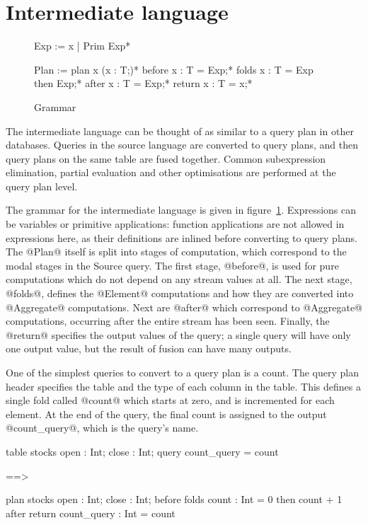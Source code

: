 \section{Intermediate language}
\label{s:IcicleCore}

\begin{figure}

\begin{code}
Exp   := x | Prim Exp*

Plan  := plan   x { (x : T;)* }
       before { x : T = Exp;* }
       folds  { x : T = Exp then Exp;* }
       after  { x : T = Exp;* }
       return { x : T = x;* }
\end{code}


\caption{Grammar}
\label{fig:core:grammar}
\end{figure}

The intermediate language can be thought of as similar to a query plan in other databases.
Queries in the source language are converted to query plans, and then query plans on the same table are fused together.
Common subexpression elimination, partial evaluation and other optimisations are performed at the query plan level.

The grammar for the intermediate language is given in figure~\ref{fig:core:grammar}.
Expressions can be variables or primitive applications: function applications are not allowed in expressions here, as their definitions are inlined before converting to query plans.
The @Plan@ itself is split into stages of computation, which correspond to the modal stages in the Source query.
The first stage, @before@, is used for pure computations which do not depend on any stream values at all.
The next stage, @folds@, defines the @Element@ computations and how they are converted into @Aggregate@ computations.
Next are @after@ which correspond to @Aggregate@ computations, occurring after the entire stream has been seen.
Finally, the @return@ specifies the output values of the query; a single query will have only one output value, but the result of fusion can have many outputs.

One of the simplest queries to convert to a query plan is a count.
The query plan header specifies the table and the type of each column in the table.
This defines a single fold called @count@ which starts at zero, and is incremented for each element.
At the end of the query, the final count is assigned to the output @count_query@, which is the query's name.
\begin{code}
table stocks { open : Int; close : Int; }
query count_query = count

==>

plan stocks { open : Int; close : Int; }
before { }
folds  { count : Int = 0 then count + 1 }
after  { }
return { count_query : Int = count }
\end{code}

